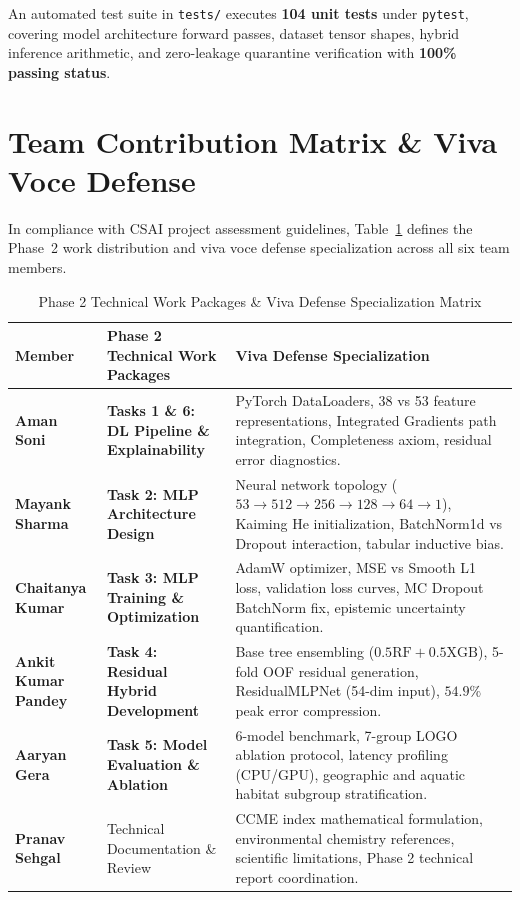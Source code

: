 \documentclass[conference]{IEEEtran}
\begin{document}
An automated test suite in \texttt{tests/} executes \textbf{104 unit tests} under \texttt{pytest},
covering model architecture forward passes, dataset tensor shapes, hybrid inference arithmetic,
and zero-leakage quarantine verification with \textbf{100\% passing status}.

\section{Team Contribution Matrix \& Viva Voce Defense}
\label{sec:team}

In compliance with CSAI project assessment guidelines, Table~\ref{tab:team_contributions}
defines the Phase~2 work distribution and viva voce defense specialization across all six team members.

\begin{table}[!t]
  \caption{Phase 2 Technical Work Packages \& Viva Defense Specialization Matrix}
  \label{tab:team_contributions}
  \centering
  \setlength{\tabcolsep}{2.5pt}
  \scriptsize
  \begin{tabular}{p{1.5cm}p{2.6cm}p{3.9cm}}
    \toprule
    \textbf{Member} & \textbf{Phase 2 Technical Work Packages} & \textbf{Viva Defense Specialization} \\
    \midrule
    \textbf{Aman Soni}
      & \textbf{Tasks 1 \& 6: DL Pipeline \& Explainability}
      & PyTorch DataLoaders, 38 vs 53 feature representations, Integrated Gradients path integration, Completeness axiom, residual error diagnostics. \\
    \midrule
    \textbf{Mayank Sharma}
      & \textbf{Task 2: MLP Architecture Design}
      & Neural network topology ($53\to 512\to 256\to 128\to 64\to 1$), Kaiming He initialization, BatchNorm1d vs Dropout interaction, tabular inductive bias. \\
    \midrule
    \textbf{Chaitanya Kumar}
      & \textbf{Task 3: MLP Training \& Optimization}
      & AdamW optimizer, MSE vs Smooth L1 loss, validation loss curves, MC Dropout BatchNorm fix, epistemic uncertainty quantification. \\
    \midrule
    \textbf{Ankit Kumar Pandey}
      & \textbf{Task 4: Residual Hybrid Development}
      & Base tree ensembling ($0.5\text{RF}+0.5\text{XGB}$), 5-fold OOF residual generation, ResidualMLPNet (54-dim input), $54.9\%$ peak error compression. \\
    \midrule
    \textbf{Aaryan Gera}
      & \textbf{Task 5: Model Evaluation \& Ablation}
      & 6-model benchmark, 7-group LOGO ablation protocol, latency profiling (CPU/GPU), geographic and aquatic habitat subgroup stratification. \\
    \midrule
    \textbf{Pranav Sehgal}
      & Technical Documentation \& Review
      & CCME index mathematical formulation, environmental chemistry references, scientific limitations, Phase 2 technical report coordination. \\
    \bottomrule
  \end{tabular}
\end{table}
\end{document}
